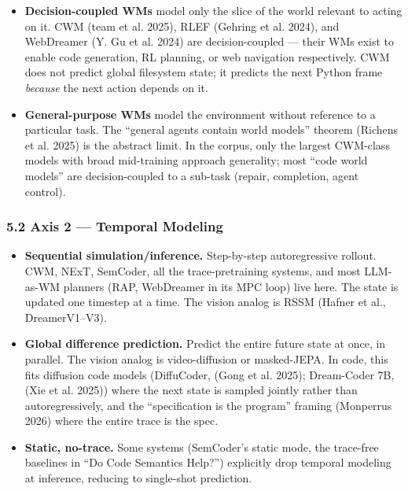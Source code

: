 \documentclass{article}
\providecommand{\tightlist}{\setlength{\itemsep}{0pt}\setlength{\parskip}{0pt}}
\begin{document}
\begin{itemize}
\tightlist
\item
  \textbf{Decision-coupled WMs} model only the slice of the world
  relevant to acting on it. CWM (team et al. 2025), RLEF (Gehring et al.
  2024), and WebDreamer (Y. Gu et al. 2024) are decision-coupled ---
  their WMs exist to enable code generation, RL planning, or web
  navigation respectively. CWM does not predict global filesystem state;
  it predicts the next Python frame \emph{because} the next action
  depends on it.
\item
  \textbf{General-purpose WMs} model the environment without reference
  to a particular task. The ``general agents contain world models''
  theorem (Richens et al. 2025) is the abstract limit. In the corpus,
  only the largest CWM-class models with broad mid-training approach
  generality; most ``code world models'' are decision-coupled to a
  sub-task (repair, completion, agent control).
\end{itemize}

\hypertarget{axis-2-temporal-modeling}{%
\subsubsection{5.2 Axis 2 --- Temporal
Modeling}\label{axis-2-temporal-modeling}}

\begin{itemize}
\tightlist
\item
  \textbf{Sequential simulation/inference.} Step-by-step autoregressive
  rollout. CWM, NExT, SemCoder, all the trace-pretraining systems, and
  most LLM-as-WM planners (RAP, WebDreamer in its MPC loop) live here.
  The state is updated one timestep at a time. The vision analog is RSSM
  (Hafner et al., DreamerV1--V3).
\item
  \textbf{Global difference prediction.} Predict the entire future state
  at once, in parallel. The vision analog is video-diffusion or
  masked-JEPA. In code, this fits diffusion code models (DiffuCoder,
  (Gong et al. 2025); Dream-Coder 7B, (Xie et al. 2025)) where the next
  state is sampled jointly rather than autoregressively, and the
  ``specification is the program'' framing (Monperrus 2026) where the
  entire trace is the spec.
\item
  \textbf{Static, no-trace.} Some systems (SemCoder's static mode, the
  trace-free baselines in ``Do Code Semantics Help?'') explicitly drop
  temporal modeling at inference, reducing to single-shot prediction.
\end{itemize}
\end{document}
